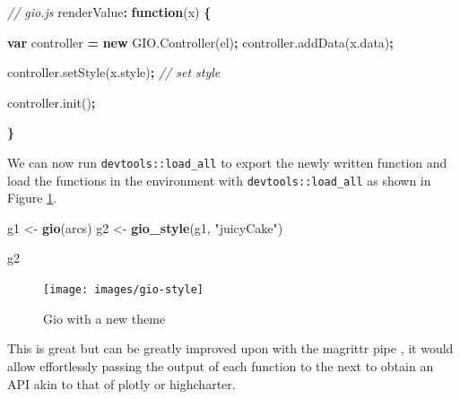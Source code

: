 \documentclass[10pt,]{krantz}
\makeatletter
\newenvironment{Shaded}{\begin{snugshade}}{\end{snugshade}}
\newcommand{\AttributeTok}[1]{\textcolor[rgb]{0.61,0.61,0.61}{#1}}
\newcommand{\CommentTok}[1]{\textcolor[rgb]{0.37,0.37,0.37}{\textit{#1}}}
\newcommand{\KeywordTok}[1]{\textcolor[rgb]{0.27,0.27,0.27}{\textbf{#1}}}
\newcommand{\NormalTok}[1]{#1}
\newcommand{\OperatorTok}[1]{\textcolor[rgb]{0.43,0.43,0.43}{\textbf{#1}}}
\newcommand{\StringTok}[1]{\textcolor[rgb]{0.5,0.5,0.5}{#1}}
\newcommand{\VariableTok}[1]{\textcolor[rgb]{0,0,0}{#1}}
\newenvironment{kframe}{%
\medskip{}
\setlength{\fboxsep}{.8em}
 \def\at@end@of@kframe{}%
 \ifinner\ifhmode%
  \def\at@end@of@kframe{\end{minipage}}%
  \begin{minipage}{\columnwidth}%
 \fi\fi%
 \def\FrameCommand##1{\hskip\@totalleftmargin \hskip-\fboxsep
 \colorbox{shadecolor}{##1}\hskip-\fboxsep
     \hskip-\linewidth \hskip-\@totalleftmargin \hskip\columnwidth}%
 \MakeFramed {\advance\hsize-\width
   \@totalleftmargin\z@ \linewidth\hsize
   \@setminipage}}%
 {\par\unskip\endMakeFramed%
 \at@end@of@kframe}
\renewenvironment{Shaded}{\begin{kframe}}{\end{kframe}}
\makeatother
\begin{document}
\begin{Shaded}
\begin{Highlighting}[]
\CommentTok{// gio.js}
\NormalTok{renderValue}\OperatorTok{:} \KeywordTok{function}\NormalTok{(x) }\OperatorTok{\{}

  \KeywordTok{var}\NormalTok{ controller }\OperatorTok{=} \KeywordTok{new} \VariableTok{GIO}\NormalTok{.}\AttributeTok{Controller}\NormalTok{(el)}\OperatorTok{;}
  \VariableTok{controller}\NormalTok{.}\AttributeTok{addData}\NormalTok{(}\VariableTok{x}\NormalTok{.}\AttributeTok{data}\NormalTok{)}\OperatorTok{;} 

  \VariableTok{controller}\NormalTok{.}\AttributeTok{setStyle}\NormalTok{(}\VariableTok{x}\NormalTok{.}\AttributeTok{style}\NormalTok{)}\OperatorTok{;} \CommentTok{// set style}

  \VariableTok{controller}\NormalTok{.}\AttributeTok{init}\NormalTok{()}\OperatorTok{;}

\OperatorTok{\}}
\end{Highlighting}
\end{Shaded}

We can now run \texttt{devtools::load\_all} to export the newly written function and load the functions in the environment with \texttt{devtools::load\_all} as shown in Figure \ref{fig:gio-style}.

\begin{Shaded}
\begin{Highlighting}[]
\NormalTok{g1 <-}\StringTok{ }\KeywordTok{gio}\NormalTok{(arcs)}
\NormalTok{g2 <-}\StringTok{ }\KeywordTok{gio_style}\NormalTok{(g1, }\StringTok{"juicyCake"}\NormalTok{)}

\NormalTok{g2}
\end{Highlighting}
\end{Shaded}

\begin{figure}[H]

{\centering \texttt{[image: images/gio-style]} 

}

\caption{Gio with a new theme}\label{fig:gio-style}
\end{figure}

This is great but can be greatly improved upon with the magrittr pipe \citep{R-magrittr}, it would allow effortlessly passing the output of each function to the next to obtain an API akin to that of plotly or highcharter.

\begin{Shaded}
\end{Shaded}
\end{document}
